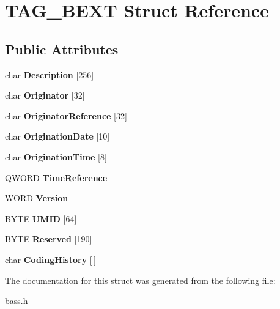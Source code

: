 \hypertarget{structTAG__BEXT}{}\section{T\+A\+G\+\_\+\+B\+E\+X\+T Struct Reference}
\label{structTAG__BEXT}
\subsection*{Public Attributes}
\begin{DoxyCompactItemize}
\item 
\hypertarget{structTAG__BEXT_a481d2bd43b1711c5cb94144f063dd2b9}{}char {\bfseries Description} \mbox{[}256\mbox{]}\label{structTAG__BEXT_a481d2bd43b1711c5cb94144f063dd2b9}

\item 
\hypertarget{structTAG__BEXT_a1b5e44f36adf8bd6bc6c3c81a296832e}{}char {\bfseries Originator} \mbox{[}32\mbox{]}\label{structTAG__BEXT_a1b5e44f36adf8bd6bc6c3c81a296832e}

\item 
\hypertarget{structTAG__BEXT_a690a6456888880532ea8fcb1e62c7e8d}{}char {\bfseries Originator\+Reference} \mbox{[}32\mbox{]}\label{structTAG__BEXT_a690a6456888880532ea8fcb1e62c7e8d}

\item 
\hypertarget{structTAG__BEXT_ab3e2ec23adcd6b882a0bc84b8cb0d6f3}{}char {\bfseries Origination\+Date} \mbox{[}10\mbox{]}\label{structTAG__BEXT_ab3e2ec23adcd6b882a0bc84b8cb0d6f3}

\item 
\hypertarget{structTAG__BEXT_a28e039d60c9ba9e4f559244e7e237dc3}{}char {\bfseries Origination\+Time} \mbox{[}8\mbox{]}\label{structTAG__BEXT_a28e039d60c9ba9e4f559244e7e237dc3}

\item 
\hypertarget{structTAG__BEXT_abae4961b0ac06cad4e7df0b0ad80c4df}{}Q\+W\+O\+R\+D {\bfseries Time\+Reference}\label{structTAG__BEXT_abae4961b0ac06cad4e7df0b0ad80c4df}

\item 
\hypertarget{structTAG__BEXT_a2f1751b9b0e537006ce9ee3c1dd001f9}{}W\+O\+R\+D {\bfseries Version}\label{structTAG__BEXT_a2f1751b9b0e537006ce9ee3c1dd001f9}

\item 
\hypertarget{structTAG__BEXT_a3e94847d78dcda770eb530b554aba777}{}B\+Y\+T\+E {\bfseries U\+M\+I\+D} \mbox{[}64\mbox{]}\label{structTAG__BEXT_a3e94847d78dcda770eb530b554aba777}

\item 
\hypertarget{structTAG__BEXT_a8333be7681d3182a55a1e4d0ad7bedec}{}B\+Y\+T\+E {\bfseries Reserved} \mbox{[}190\mbox{]}\label{structTAG__BEXT_a8333be7681d3182a55a1e4d0ad7bedec}

\item 
\hypertarget{structTAG__BEXT_aa0a77ec791071828c559b4d974f71aa5}{}char {\bfseries Coding\+History} \mbox{[}$\,$\mbox{]}\label{structTAG__BEXT_aa0a77ec791071828c559b4d974f71aa5}

\end{DoxyCompactItemize}


The documentation for this struct was generated from the following file\+:\begin{DoxyCompactItemize}
\item 
bass.\+h\end{DoxyCompactItemize}
